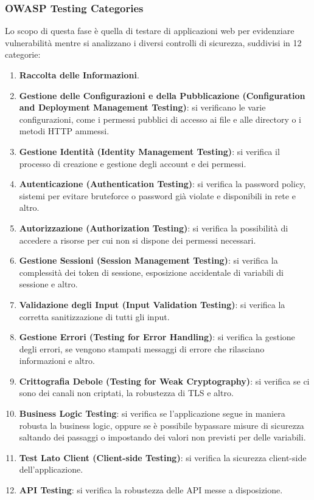 \documentclass{article}
\begin{document}
\subsubsection{OWASP Testing Categories}
Lo scopo di questa fase è quella di testare di applicazioni web per evidenziare vulnerabilità mentre si analizzano i diversi controlli di sicurezza, suddivisi in 12 categorie:
\begin{enumerate}
    \item \textbf{Raccolta delle Informazioni}.
    
    \item \textbf{Gestione delle Configurazioni e della Pubblicazione (Configuration and Deployment Management Testing)}: si verificano le varie configurazioni, come i permessi pubblici di accesso ai file e alle directory o i metodi HTTP ammessi.

    \item \textbf{Gestione Identità (Identity Management Testing)}: si verifica il processo di creazione e gestione degli account e dei permessi.

    \item \textbf{Autenticazione (Authentication Testing)}: si verifica la password policy, sistemi per evitare bruteforce o password già violate 
    e disponibili in rete e altro.

    \item \textbf{Autorizzazione (Authorization Testing)}: si verifica la possibilità di accedere a risorse per cui non si dispone dei permessi necessari.

    \item \textbf{Gestione Sessioni (Session Management Testing)}: si verifica la complessità dei token di sessione, esposizione accidentale di variabili di sessione e altro.

    \item \textbf{Validazione degli Input (Input Validation Testing)}: si verifica la corretta sanitizzazione di tutti gli input.

    \item \textbf{Gestione Errori (Testing for Error Handling)}: si verifica la gestione degli errori, se vengono stampati messaggi di errore che rilasciano informazioni e altro.

    \item \textbf{Crittografia Debole (Testing for Weak Cryptography)}: si verifica se ci sono dei canali non criptati, la robustezza di TLS e altro.

    \item \textbf{Business Logic Testing}: si verifica se l’applicazione segue in maniera robusta la business logic, oppure se è possibile bypassare misure di sicurezza saltando dei passaggi o impostando dei valori non previsti per delle variabili.

    \item \textbf{Test Lato Client (Client-side Testing)}: si verifica la sicurezza client-side dell’applicazione.

    \item \textbf{API Testing}: si verifica la robustezza delle API messe a disposizione.
\end{enumerate}
\end{document}
